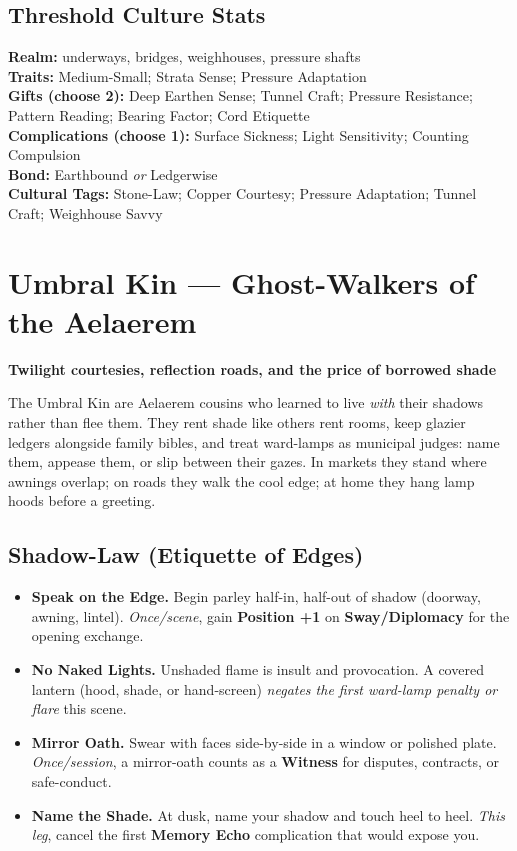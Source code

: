 \documentclass[11pt,letterpaper]{article}
\begin{document}
\subsection*{Threshold Culture Stats}
\textbf{Realm:} underways, bridges, weighhouses, pressure shafts \\
\textbf{Traits:} Medium-Small; Strata Sense; Pressure Adaptation \\
\textbf{Gifts (choose 2):} Deep Earthen Sense; Tunnel Craft; Pressure Resistance; Pattern Reading; Bearing Factor; Cord Etiquette \\
\textbf{Complications (choose 1):} Surface Sickness; Light Sensitivity; Counting Compulsion \\
\textbf{Bond:} Earthbound \emph{or} Ledgerwise \\
\textbf{Cultural Tags:} Stone-Law; Copper Courtesy; Pressure Adaptation; Tunnel Craft; Weighhouse Savvy

\section{Umbral Kin --- Ghost-Walkers of the Aelaerem}

\textbf{Twilight courtesies, reflection roads, and the price of borrowed shade}

The Umbral Kin are Aelaerem cousins who learned to live \emph{with} their shadows rather than flee them. They rent shade like others rent rooms, keep glazier ledgers alongside family bibles, and treat ward-lamps as municipal judges: name them, appease them, or slip between their gazes. In markets they stand where awnings overlap; on roads they walk the cool edge; at home they hang lamp hoods before a greeting.

\subsection*{Shadow-Law (Etiquette of Edges)}
\begin{itemize}
\item \textbf{Speak on the Edge.} Begin parley half-in, half-out of shadow (doorway, awning, lintel). \emph{Once/scene}, gain \textbf{Position +1} on \textbf{Sway/Diplomacy} for the opening exchange.
\item \textbf{No Naked Lights.} Unshaded flame is insult and provocation. A covered lantern (hood, shade, or hand-screen) \emph{negates the first ward-lamp penalty or flare} this scene.
\item \textbf{Mirror Oath.} Swear with faces side-by-side in a window or polished plate. \emph{Once/session}, a mirror-oath counts as a \textbf{Witness} for disputes, contracts, or safe-conduct.
\item \textbf{Name the Shade.} At dusk, name your shadow and touch heel to heel. \emph{This leg}, cancel the first \textbf{Memory Echo} complication that would expose you.
\end{itemize}
\end{document}

